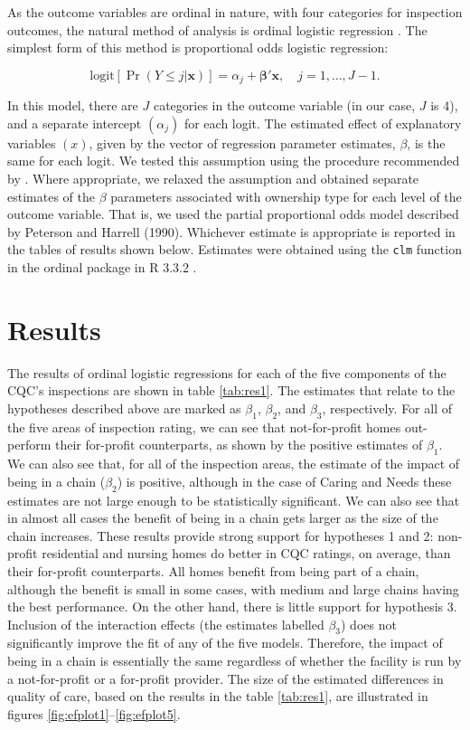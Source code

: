 \documentclass[a4paper,11pt,titlepage,british]{article}
\begin{document}
As the outcome variables are ordinal in nature, with four categories for inspection outcomes, the natural method of analysis is ordinal logistic regression \parencite{Agresti2013}. The simplest form of this method is proportional odds logistic regression:

\begin{equation*}
  \mathrm{logit}[\Pr(Y \le j | \boldsymbol{x})] = \alpha_j + \boldsymbol{\beta' x}, \quad j = 1, \dots, J - 1.
\end{equation*}

In this model, there are $J$ categories in the outcome variable (in our case, $J$ is 4), and a separate intercept $(\alpha_j)$ for each logit. The estimated effect of explanatory variables $(x)$, given by the vector of regression parameter estimates, $\beta$, is the same for each logit.  We tested this assumption using the procedure recommended by \textcite[335]{Harrell2001}.  Where appropriate, we relaxed the assumption and obtained separate estimates of the $\beta$ parameters associated with ownership type for each level of the outcome variable.  That is, we used the partial proportional odds model described by Peterson and Harrell (1990).  Whichever estimate is appropriate is reported in the tables of results shown below. Estimates were obtained using the \texttt{clm} function in the ordinal package \parencite{Christensen2015} in R 3.3.2 \parencite{R2017}.


\section{Results}

The results of ordinal logistic regressions for each of the five components of the CQC's inspections are shown in table \ref{tab:res1}.  The estimates that relate to the hypotheses described above are marked as $\beta_1$, $\beta_2$, and $\beta_3$, respectively.  For all of the five areas of inspection rating, we can see that not-for-profit homes out-perform their for-profit counterparts, as shown by the positive estimates of $\beta_1$.  We can also see that, for all of the inspection areas, the estimate of the impact of being in a chain ($\beta_2$) is positive, although in the case of Caring and Needs these estimates are not large enough to be statistically significant.  We can also see that in almost all cases the benefit of being in a chain gets larger as the size of the chain increases.  These results provide strong support for hypotheses 1 and 2: non-profit residential and nursing homes do better in CQC ratings, on average, than their for-profit counterparts.  All homes benefit from being part of a chain, although the benefit is small in some cases, with medium and large chains having the best performance.  On the other hand, there is little support for hypothesis 3.  Inclusion of the interaction effects (the estimates labelled $\beta_3$) does not significantly improve the fit of any of the five models.  Therefore, the impact of being in a chain is essentially the same regardless of whether the facility is run by a not-for-profit or a for-profit provider.  The size of the estimated differences in quality of care, based on the results in the table \ref{tab:res1}, are illustrated in figures \ref{fig:efplot1}--\ref{fig:efplot5}.
\end{document}
